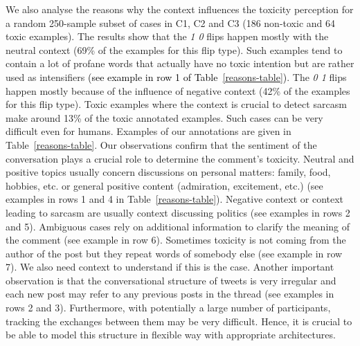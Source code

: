 \documentclass[acmsmall]{acmart}
\newcommand{\red}[1]{\textcolor{black}{#1}}
\begin{document}
We also analyse the reasons why the context influences the toxicity perception for a random 250-sample subset of cases in C1, C2 and C3 (186 non-toxic and 64 toxic examples). The results show that the \textit{1  0} flips happen mostly with the neutral context (69\% of the examples for this flip type). Such examples tend to contain a lot of profane words that actually have no toxic intention but are rather used as intensifiers \red{(see example in row 1 of Table~\ref{reasons-table})}. The \textit{0  1} flips happen mostly because of the influence of negative context (42\% of the examples for this flip type). Toxic examples where the context is crucial to detect sarcasm make around 13\% of the toxic annotated examples. Such cases can be very difficult even for humans. Examples of our annotations are given in Table~\ref{reasons-table}. Our observations confirm that the sentiment of the conversation plays a crucial role to determine the comment's toxicity. Neutral and positive topics usually concern discussions on personal matters: family, food, hobbies, etc. or general positive content (admiration, excitement, etc.) (see examples in rows 1 and 4 in Table~\ref{reasons-table}). Negative context or context leading to sarcasm are usually context discussing politics (see examples in rows 2 and 5). Ambiguous cases rely on additional information to clarify the meaning of the comment (see example in row 6). Sometimes toxicity is not coming from the author of the post but they repeat words of somebody else (see example in row 7). We also need context to understand if this is the case. Another important observation is that the conversational structure of tweets is very irregular and each new post may refer to any previous posts in the thread (see examples in rows 2 and 3). Furthermore, with potentially a large number of participants, tracking the exchanges between them may be very difficult. Hence, it is crucial to be able to model this structure in flexible way with appropriate architectures.
\end{document}
